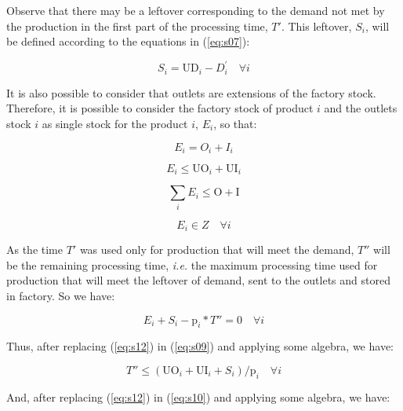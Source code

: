 \documentclass[authoryear,manuscript,12pt]{elsarticle}
\begin{document}
Observe that there may be a leftover corresponding to the demand not met by the production in the first part of the processing time, $T'$. This leftover, $S_i$, will be defined according to the equations in (\ref{eq:s07}):

\begin{equation}
\label{eq:s07}
S_i = \textrm{UD}_i - D_{i}^{'} \quad \forall i
\end{equation}

It is also possible to consider that outlets are extensions of the factory stock. Therefore, it is possible to consider the factory stock of product $i$ and the outlets stock $i$ as single stock for the product $i$, $E_i$, so that:

\begin{equation}
\label{eq:s08}
E_i = O_i + I_i
\end{equation}

\begin{equation}
\label{eq:s09}
E_i \leq \textrm{UO}_i + \textrm{UI}_i
\end{equation}

\begin{equation}
\label{eq:s10}
\sum_i {E_i} \leq \textrm{O} + \textrm{I}
\end{equation}

\begin{equation}
\label{eq:s11}
E_i \in Z \quad \forall i
\end{equation}

As the time $T'$ was used only for production that will meet the demand, $T''$  will be the remaining processing time, \emph{i.e.} the maximum processing time used for production that will meet the leftover of demand, sent to the outlets and stored in factory. So we have:

\begin{equation}
\label{eq:s12}
E_i + S_i - \textrm{p}_i * T''  = 0 \quad \forall i
\end{equation}

\noindent Thus, after replacing (\ref{eq:s12}) in (\ref{eq:s09}) and applying some algebra, we have:

\begin{equation}
\label{eq:s13}
T''  \leq (\textrm{UO}_i + \textrm{UI}_i + S_i) / \textrm{p}_i \quad \forall i
\end{equation}

\noindent And, after replacing (\ref{eq:s12}) in (\ref{eq:s10}) and applying some algebra, we have:
\end{document}
